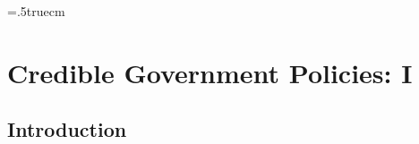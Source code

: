 




%

%
%



\overfullrule=0pt
\parindent=.5truecm
\def\refshape{\parshape 2 0truecm 14.765truecm 1truecm
14.765truecm\noindent}

\def\book#1#2#3{\refshape #1.  {\sl #2}. #3.}

\def\article#1#2#3#4{\refshape #1. `#2'. {\sl #3},
#4.}

\def\contribution#1#2#3#4#5{\refshape #1. `#2'. In #3
(eds.), {\sl #4}. #5.}

\def\ocontribution#1#2#3#4#5{\refshape #1. `#2'. In #3
(ed.), {\sl #4} #5.}

\def\mimeo#1#2#3{\refshape #1. `#2'.  Mimeo. #3.}

\def\dissertation#1#2#3{\refshape #1. `#2'. Ph.D.\
dissertation, #3.}

\def\bull{\vrule height .9ex width .8ex depth -.1ex}
\def\bh{\penalty-100}



%
\def\frac#1/#2{\leavevmode\kern.1em
 \raise.5ex\hbox{\the\scriptfont0 #1}\kern-.1em
 /\kern-.15em\lower.25ex\hbox{\the\scriptfont0 #2}}
%
\showchaptIDtrue
\def\@chaptID{16.}

\def\bbR{{I\kern-0.3em R}}

%
%

\chapter{Credible Government Policies: I\label{credible}}

\section{Introduction}

